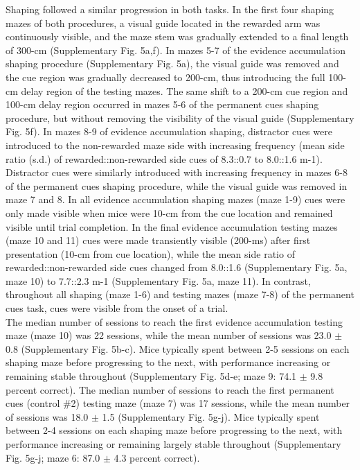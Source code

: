 Shaping followed a similar progression in both tasks. In the first four shaping mazes of both procedures, a visual guide located in the rewarded arm was continuously visible, and the maze stem was gradually extended to a final length of 300-cm (Supplementary Fig. 5a,f). In mazes 5-7 of the evidence accumulation shaping procedure (Supplementary Fig. 5a), the visual guide was removed and the cue region was gradually decreased to 200-cm, thus introducing the full 100-cm delay region of the testing mazes. The same shift to a 200-cm cue region and 100-cm delay region occurred in mazes 5-6 of the permanent cues shaping procedure, but without removing the visibility of the visual guide (Supplementary Fig. 5f). In mazes 8-9 of evidence accumulation shaping, distractor cues were introduced to the non-rewarded maze side with increasing frequency (mean side ratio (s.d.) of rewarded::non-rewarded side cues of 8.3::0.7 to 8.0::1.6 m-1). Distractor cues were similarly introduced with increasing frequency in mazes 6-8 of the permanent cues shaping procedure, while the visual guide was removed in maze 7 and 8. In all evidence accumulation shaping mazes (maze 1-9) cues were only made visible when mice were 10-cm from the cue location and remained visible until trial completion. In the final evidence accumulation testing mazes (maze 10 and 11) cues were made transiently visible (200-ms) after first presentation (10-cm from cue location), while the mean side ratio of rewarded::non-rewarded side cues changed from 8.0::1.6 (Supplementary Fig. 5a, maze 10) to 7.7::2.3 m-1 (Supplementary Fig. 5a, maze 11). In contrast, throughout all shaping (maze 1-6) and testing mazes (maze 7-8) of the permanent cues task, cues were visible from the onset of a trial. \\
The median number of sessions to reach the first evidence accumulation testing maze (maze 10) was 22 sessions, while the mean number of sessions was 23.0 $\pm$ 0.8 (Supplementary Fig. 5b-c). Mice typically spent between 2-5 sessions on each shaping maze before progressing to the next, with performance increasing or remaining stable throughout (Supplementary Fig. 5d-e; maze 9: 74.1 $\pm$ 9.8 percent correct). The median number of sessions to reach the first permanent cues (control \#2) testing maze (maze 7) was 17 sessions, while the mean number of sessions was 18.0 $\pm$ 1.5 (Supplementary Fig. 5g-j). Mice typically spent between 2-4 sessions on each shaping maze before progressing to the next, with performance increasing or remaining largely stable throughout (Supplementary Fig. 5g-j; maze 6: 87.0 $\pm$ 4.3 percent correct). \\
